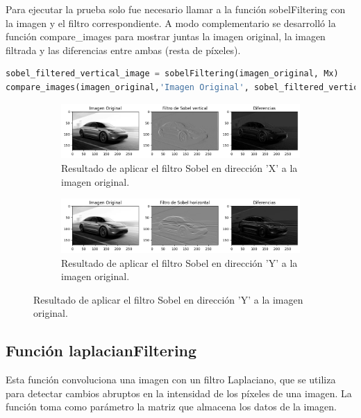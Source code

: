 \documentclass{article}
\begin{document}
    \clearpage
    \noindent
    Para ejecutar la prueba solo fue necesario llamar a la función sobelFiltering con la imagen y el filtro correspondiente.
    A modo complementario se desarrolló la función compare\_images para mostrar juntas la imagen original, la imagen filtrada y las diferencias entre ambas (resta de píxeles).
    
    \begin{lstlisting}[language=Python, caption={Ejecutando sobelFiltering},label={lst:compareImages}]
sobel_filtered_vertical_image = sobelFiltering(imagen_original, Mx)
compare_images(imagen_original,'Imagen Original', sobel_filtered_vertical_image, 'Filtro de Sobel vertical')
    \end{lstlisting}
    
    \begin{figure}[!ht]
        \centering
        \begin{subfigure}
            \centering
            \includegraphics[width=\linewidth]{img/sobelx}
            \caption{ Resultado de aplicar el filtro Sobel en dirección 'X' a la imagen original.}
            \label{fig:sobelx}
        \end{subfigure}
        \begin{subfigure}
            \centering
            \includegraphics[width=\linewidth]{img/sobely}
            \caption{ Resultado de aplicar el filtro Sobel en dirección 'Y' a la imagen original.}
            \label{fig:sobely}
        \end{subfigure}
    \end{figure}
    
    \noindent
    \clearpage
    
    \subsection{Función laplacianFiltering}\label{subsec:funcion-laplacianfiltering}
    Esta función convoluciona una imagen con un filtro Laplaciano, que se utiliza para detectar cambios abruptos en la intensidad de los píxeles de una imagen.
    La función toma como parámetro la matriz que almacena los datos de la imagen.
    
\end{document}
